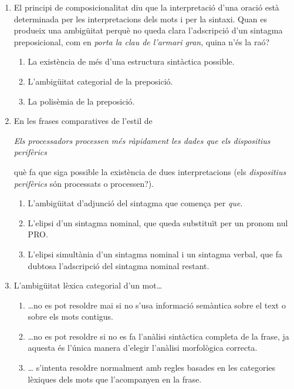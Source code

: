 \begin{enumerate}
\item 
   El principi de composicionalitat diu que la interpretació d'una
   oració està determinada per les interpretacions dels mots i per la
   sintaxi. Quan es produeix una ambigüitat perquè no queda clara
   l'adscripció d'un sintagma preposicional, com en \emph{porta la clau
   de l'armari gran}, quina n'és la raó?

   
\begin{enumerate}
\item La existència de més d'una estructura sintàctica possible.
\item L'ambigüitat categorial de la preposició.
\item La polisèmia de la preposició.
\end{enumerate}
\item 
   En les frases comparatives de l'estil de
   \begin{center}\emph{Els processadors 
       processen més ràpidament les dades que els dispositius
       perifèrics}\end{center} què fa que siga possible la existència
   de dues interpretacions (els \emph{dispositius perifèrics} són
   processats o processen?).
   
\begin{enumerate}
\item L'ambigüitat d'adjunció del sintagma que comença per \emph{que}.
\item L'elipsi d'un sintagma nominal, que queda substituït per un
     pronom nul PRO.
\item L'elipsi simultània d'un sintagma nominal i un sintagma
     verbal, que fa dubtosa l'adscripció del sintagma nominal restant.
\end{enumerate}

\item L'ambigüitat lèxica categorial d'un mot{\ldots}
\begin{enumerate}
\item {\ldots}no es pot resoldre mai si no s'usa informació semàntica
sobre el text o sobre els mots contigus.
\item {\ldots}no es pot resoldre si no es fa l'anàlisi sintàctica
completa de la frase, ja aquesta és l'única manera d'elegir l'anàlisi
morfològica correcta.
\item {\ldots} s'intenta resoldre normalment amb regles basades en les
  categories lèxiques dels mots que l'acompanyen en la frase.
\end{enumerate}


\end{enumerate}
